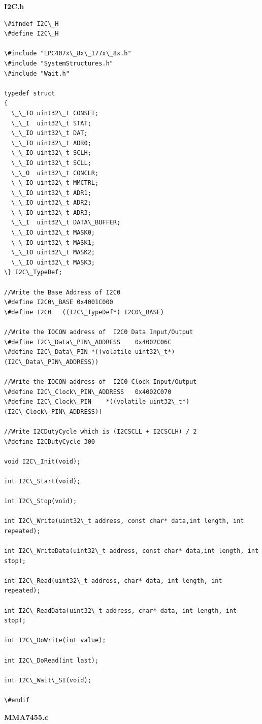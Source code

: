 \documentclass{article}
\begin{document}
\linebreak
\textbf{I2C.h}
\begin{lstlisting}
\#ifndef I2C\_H
\#define I2C\_H

\#include "LPC407x\_8x\_177x\_8x.h"
\#include "SystemStructures.h"
\#include "Wait.h"

typedef struct
{
  \_\_IO uint32\_t CONSET;
  \_\_I  uint32\_t STAT;
  \_\_IO uint32\_t DAT;
  \_\_IO uint32\_t ADR0;
  \_\_IO uint32\_t SCLH;
  \_\_IO uint32\_t SCLL;
  \_\_O  uint32\_t CONCLR;
  \_\_IO uint32\_t MMCTRL;
  \_\_IO uint32\_t ADR1;
  \_\_IO uint32\_t ADR2;
  \_\_IO uint32\_t ADR3;
  \_\_I  uint32\_t DATA\_BUFFER;
  \_\_IO uint32\_t MASK0;
  \_\_IO uint32\_t MASK1;
  \_\_IO uint32\_t MASK2;
  \_\_IO uint32\_t MASK3;
\} I2C\_TypeDef;

//Write the Base Address of I2C0
\#define I2C0\_BASE	0x4001C000
\#define I2C0	((I2C\_TypeDef*) I2C0\_BASE)

//Write the IOCON address of  I2C0 Data Input/Output
\#define I2C\_Data\_PIN\_ADDRESS	0x4002C06C
\#define I2C\_Data\_PIN	*((volatile uint32\_t*)(I2C\_Data\_PIN\_ADDRESS))

//Write the IOCON address of  I2C0 Clock Input/Output
\#define I2C\_Clock\_PIN\_ADDRESS	0x4002C070
\#define I2C\_Clock\_PIN	*((volatile uint32\_t*)(I2C\_Clock\_PIN\_ADDRESS))

//Write I2CDutyCycle which is (I2CSCLL + I2CSCLH) / 2
\#define I2CDutyCycle 300

void I2C\_Init(void);

int I2C\_Start(void);

int I2C\_Stop(void);

int I2C\_Write(uint32\_t address, const char* data,int length, int repeated);

int I2C\_WriteData(uint32\_t address, const char* data,int length, int stop);

int I2C\_Read(uint32\_t address, char* data, int length, int repeated);

int I2C\_ReadData(uint32\_t address, char* data, int length, int stop);

int I2C\_DoWrite(int value);

int I2C\_DoRead(int last);

int I2C\_Wait\_SI(void);

\#endif

\end{lstlisting}
\linebreak
\textbf{MMA7455.c}
\end{document}
